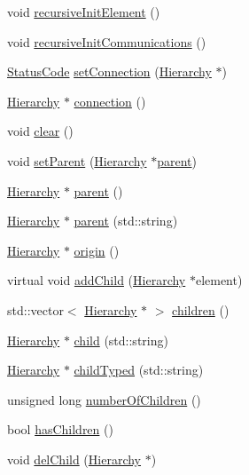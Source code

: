 \begin{DoxyCompactItemize}
void \hyperlink{classElement_a3c0abcb36f8906688bb7e32608df7086}{recursive\+Init\+Element} ()
\item 
void \hyperlink{classElement_a82119ed37dff76508a2746a853ec35ba}{recursive\+Init\+Communications} ()
\item 
\hyperlink{classStatusCode}{Status\+Code} \hyperlink{classElement_ab476b4b1df5954141ceb14f072433b89}{set\+Connection} (\hyperlink{classHierarchy}{Hierarchy} $\ast$)
\item 
\hyperlink{classHierarchy}{Hierarchy} $\ast$ \hyperlink{classElement_af57444353c1ddf9fa0109801e97debf7}{connection} ()
\item 
void \hyperlink{classHierarchy_af4d43b0765b402670eed2d62c73405af}{clear} ()
\item 
void \hyperlink{classHierarchy_a585ad1aeec16077a0e532ab8b4fc557b}{set\+Parent} (\hyperlink{classHierarchy}{Hierarchy} $\ast$\hyperlink{classHierarchy_a1c7bec8257e717f9c1465e06ebf845fc}{parent})
\item 
\hyperlink{classHierarchy}{Hierarchy} $\ast$ \hyperlink{classHierarchy_a1c7bec8257e717f9c1465e06ebf845fc}{parent} ()
\item 
\hyperlink{classHierarchy}{Hierarchy} $\ast$ \hyperlink{classHierarchy_ad550588733bf75ac5c0fcfd7c8fd11a6}{parent} (std\+::string)
\item 
\hyperlink{classHierarchy}{Hierarchy} $\ast$ \hyperlink{classHierarchy_aee461dc930ce3871636ff87f075b1b83}{origin} ()
\item 
virtual void \hyperlink{classHierarchy_ad677774ff38fcb257c04a3a10d471fac}{add\+Child} (\hyperlink{classHierarchy}{Hierarchy} $\ast$element)
\item 
std\+::vector$<$ \hyperlink{classHierarchy}{Hierarchy} $\ast$ $>$ \hyperlink{classHierarchy_aa9a76f69e98e052ee1a6e32cea006288}{children} ()
\item 
\hyperlink{classHierarchy}{Hierarchy} $\ast$ \hyperlink{classHierarchy_a1e207f973c694b538bf90107b4868817}{child} (std\+::string)
\item 
\hyperlink{classHierarchy}{Hierarchy} $\ast$ \hyperlink{classHierarchy_a0c15a5276a3b80b4354d6bd8a01e0708}{child\+Typed} (std\+::string)
\item 
unsigned long \hyperlink{classHierarchy_ab16e84de65fd84e14001a6cf941c8be4}{number\+Of\+Children} ()
\item 
bool \hyperlink{classHierarchy_a255174fe4d316d2a3f430dcb9dab29f1}{has\+Children} ()
\item 
void \hyperlink{classHierarchy_a2b2b359fac003233f65786a616766bde}{del\+Child} (\hyperlink{classHierarchy}{Hierarchy} $\ast$)

\end{DoxyCompactItemize}

